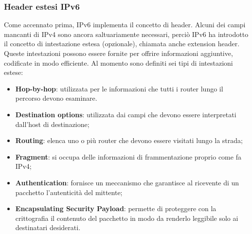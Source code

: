 \documentclass{article}
\begin{document}
            \subsubsection*{Header estesi IPv6}
            Come accennato prima, IPv6 implementa il concetto di header. Alcuni dei campi mancanti di
            IPv4 sono ancora saltuariamente necessari, perciò IPv6 ha introdotto il concetto di intestazione
            estesa (opzionale), chiamata anche extension header. Queste intestazioni possono essere
            fornite per offrire informazioni aggiuntive, codificate in modo efficiente. Al momento sono
            definiti sei tipi di intestazioni estese:

            \begin{itemize}
                \item \textbf{Hop-by-hop}: utilizzata per le informazioni che tutti i router lungo il percorso devono
                esaminare.
                \item \textbf{Destination options}: utilizzata dai campi che devono essere interpretati dall’host di
                destinazione;
                \item \textbf{Routing}: elenca uno o più router che devono essere visitati lungo la strada;
                \item \textbf{Fragment}: si occupa delle informazioni di frammentazione proprio come fa IPv4;
                \item \textbf{Authentication}: fornisce un meccanismo che garantisce al ricevente di un pacchetto
                l’autenticità del mittente;
                \item \textbf{Encapsulating Security Payload}: permette di proteggere con la crittografia il
                contenuto del pacchetto in modo da renderlo leggibile solo ai destinatari desiderati.
            \end{itemize}
            
\end{document}
